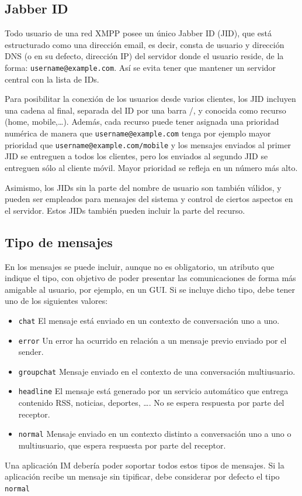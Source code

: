 \documentclass[a4paper, 11pt]{article} %
\begin{document}
  \subsection{Jabber ID}
  Todo usuario de una red XMPP posee un único Jabber ID (JID), que está estructurado como una dirección email, es decir, 
  consta de usuario y dirección DNS (o en su defecto, dirección IP) del servidor donde el usuario reside, de la forma:
  \texttt{username@example.com}. Así se evita tener que mantener un servidor central con la lista de IDs.
  
  Para posibilitar la conexión de los usuarios desde varios clientes, los JID incluyen una cadena al final, separada
  del ID por una barra /, y conocida como recurso (home, mobile,\ldots). Además, cada recurso puede
  tener asignada una prioridad numérica de manera que \texttt{username@example.com} tenga por ejemplo mayor prioridad que 
  \texttt{username@example.com/mobile} y los mensajes enviados al primer JID se entreguen a todos los clientes,
  pero los enviados al segundo JID se entreguen sólo al cliente móvil. Mayor prioridad se refleja en un número más alto.
  
  Asimismo, los JIDs sin la parte del nombre de usuario son también válidos, y pueden ser empleados para mensajes del
  sistema y control de ciertos aspectos en el servidor. Estos JIDs también pueden incluir la parte del recurso.
  
  
  \subsection{Tipo de mensajes}
    En los mensajes se puede incluir, aunque no es obligatorio, un atributo que indique el tipo, con objetivo de poder
    presentar las comunicaciones de forma más amigable al usuario, por ejemplo, en un GUI. Si se incluye dicho tipo, debe
    tener uno de los siguientes valores:
    \begin{itemize}
     \item \texttt{chat} El mensaje está enviado en un contexto de conversación uno a uno.
     \item \texttt{error} Un error ha ocurrido en relación a un mensaje previo enviado por el sender.
     \item \texttt{groupchat} Mensaje enviado en el contexto de una conversación multiusuario.
     \item \texttt{headline} El mensaje está generado por un servicio automático que entrega contenido RSS, noticias, 
     deportes, \ldots. No se espera respuesta por parte del receptor.
     \item \texttt{normal} Mensaje enviado en un contexto distinto a conversación uno a uno o multiusuario, que espera
     respuesta por parte del receptor.
    \end{itemize}
    Una aplicación IM debería poder soportar todos estos tipos de mensajes. Si la aplicación recibe un mensaje sin tipificar,
    debe considerar por defecto el tipo \texttt{normal}  
  
\end{document}
